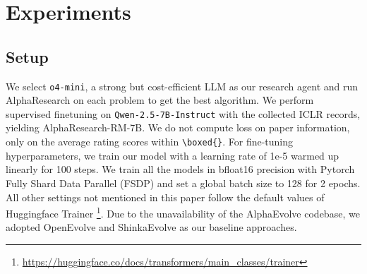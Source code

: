 
\section{Experiments}

\subsection{Setup}
We select \texttt{o4-mini}, a strong but cost-efficient LLM as our research agent and run AlphaResearch on each problem to get the best algorithm. We perform supervised finetuning on \texttt{Qwen-2.5-7B-Instruct} \citep{yang2025qwen3} with the collected ICLR records, yielding AlphaResearch-RM-7B. We do not compute loss on paper information, only on the average rating scores within \texttt{\textbackslash boxed\{\}}. For fine-tuning hyperparameters, we train our model with a learning rate of 1e-5 warmed up linearly for 100 steps. We train all the models in bfloat16 precision with Pytorch
Fully Shard Data Parallel (FSDP) and set a global batch size to 128 for 2 epochs.
All other settings not mentioned in this paper follow the default values
of Huggingface Trainer \footnote{\url{https://huggingface.co/docs/transformers/main_classes/trainer}}. Due to the unavailability of the AlphaEvolve codebase, we adopted OpenEvolve and ShinkaEvolve as our baseline approaches.


